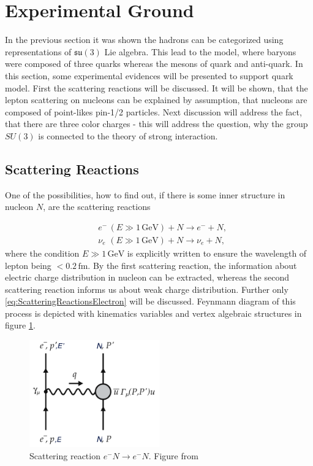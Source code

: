 \documentclass[a4paper,11pt]{report}
\newcommand{\GeV}{\,\text{GeV}}
\begin{document}
\section{Experimental Ground}

In the previous section it was shown the hadrons can be categorized using
representations of $\mathfrak{su}(3)$ Lie algebra. This lead to the model, where
baryons were composed of three quarks whereas the mesons of quark and
anti-quark. In this section, some experimental evidences will be presented to
support quark model. First the scattering reactions will be discussed. It will
be shown, that the lepton scattering on nucleons can be explained by assumption,
that nucleons are composed of point-likes pin-1/2 particles. Next discussion
will address the fact, that there are three color charges - this will address
the question, why the group $SU(3)$ is connected to the theory of strong
interaction.

\subsection{Scattering Reactions}

One of the possibilities, how to find out, if there is some inner structure in
nucleon $N$, are the scattering reactions

\begin{align}
  &e^- \, (E \gg 1\GeV) + N \rightarrow e^- + N,
  \label{eq:ScatteringReactionsElectron} \\
  &\nu_e \,\, (E \gg 1\GeV) + N \rightarrow \nu_e + N,
  \label{eq:ScatteringReactionsNeutrino}
\end{align}
where the condition $E \gg 1 \GeV$ is explicitly written to ensure the wavelength
of lepton being $< 0.2\,\text{fm}$. By the first scattering reaction, the information
about electric charge distribution in nucleon can be extracted, whereas the
second scattering reaction informs us about weak charge distribution. Further only
\eqref{eq:ScatteringReactionsElectron} will be discussed. Feynmann diagram of this
process is depicted with kinematics variables and vertex algebraic structures 
in figure \ref{fig:Scattering}. 

\begin{figure}[t]
  \centering
  \includegraphics[width=0.5\textwidth]{Chapter1/Scattering.png} 
  \caption{Scattering reaction $e^-N \rightarrow e^-N$. Figure from
    \cite{QCDTextbook}}
  \label{fig:Scattering}
\end{figure}
\end{document}
